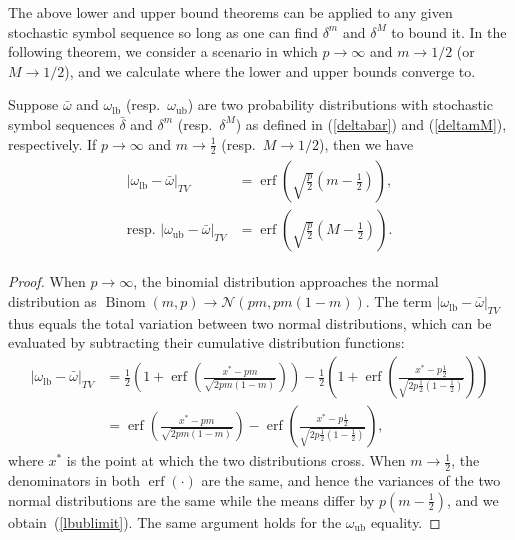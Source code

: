 \documentclass[final]{siamltex}
\DeclareMathOperator{\erf}{erf}
\begin{document}
The above lower and upper bound theorems can be applied to any given
stochastic symbol sequence so long as one can find $\delta^m$ and
$\delta^M$ to bound it. In the following theorem, we consider a
scenario in which $p \to \infty$ and $m \to 1/2$ (or $M \to 1/2$), and
we calculate where the lower and upper bounds converge to.

\begin{theorem}
  \label{theoremapproxlb} Suppose $\bar{\omega}$ and
  $\omega_{\text{lb}}$ (resp.\ $\omega_{\text{ub}}$) are two
  probability distributions with stochastic symbol sequences
  $\bar{\delta}$ and $\delta^m$ (resp.\ $\delta^M$) as defined in
  (\ref{deltabar}) and (\ref{deltamM}), respectively. If $p \to
  \infty$ and $m \to \frac{1}{2}$ (resp.\
  $M \to 1/2$), then we have
  \begin{align}
    \begin{split}
      \label{lbublimit}
      |\omega_{\text{lb}}-\bar{\omega}|_{TV}
      & =  \erf \left( \sqrt{\frac{p}{2}}\left(m-\frac{1}{2}\right)\right), \\
      \text{resp. }  |\omega_{\text{ub}}-\bar{\omega}|_{TV}
      & =  \erf \left( \sqrt{\frac{p}{2}}\left(M-\frac{1}{2}\right)\right).
    \end{split}
  \end{align}
\end{theorem}
\begin{proof}
  When $p\to \infty$, the binomial distribution approaches the normal
  distribution as $\operatorname{Binom}(m,p) \to \mathcal{N}(pm,
  pm(1-m))$.  The term $|\omega_{\text{lb}}-\bar{\omega}|_{TV}$ thus
  equals the total variation between two normal distributions, which
  can be evaluated by subtracting their cumulative distribution
  functions:
  \begin{align}
    |\omega_{\text{lb}}-\bar{\omega}|_{TV} &=
    \frac{1}{2}\left(1+\erf\left(\frac{x^*-pm}{\sqrt{2pm(1-m)}}\right)\right)
    -\frac{1}{2}\left(1+\erf\left(\frac{x^*-p\frac{1}{2}}{\sqrt{2p\frac{1}{2}(1-\frac{1}{2})}}\right)\right) \nonumber\\
    &=\erf\left(\frac{x^*-pm}{\sqrt{2pm(1-m)}}\right)-
    \erf\left(\frac{x^*-p\frac{1}{2}}{\sqrt{2p\frac{1}{2}(1-\frac{1}{2})}}\right),
  \end{align}
  where $x^*$ is the point at which the two distributions cross. When
  $m \to \frac{1}{2}$, the denominators in both $\erf(\cdot)$ are the
  same, and hence the variances of the two normal distributions are
  the same while the means differ by $p(m-\frac{1}{2})$, and we
  obtain~(\ref{lbublimit}). The same argument holds for the
  $\omega_{\text{ub}}$ equality.
\end{proof}
\end{document}
